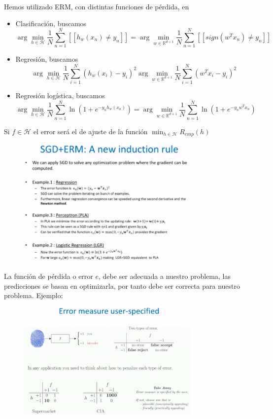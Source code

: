 \documentclass[11pt,a4paper]{article}
\theoremstyle{definition}
\newcommand{\R}{\mathbb{R}}
\begin{document}
	Hemos utilizado ERM, con distintas funciones de pérdida, en 
	\begin{itemize}
		\item Clasificación, buscamos $$\arg \min_{h\in \mathcal{H}} \frac{1}{N} \sum_{n=1}^N [[h_w(x_n)\neq y_n]] = \arg \min_{w\in \R^{d+1}} \frac{1}{N} \sum_{n=1}^N [[sign(w^Tx_n)\neq y_n]]$$
		
		\item Regresión, buscamos $$\arg \min_{h\in \mathcal{H}} \frac{1}{N}\sum_{i=1}^N(h_w(x_i)-y_i)^2 \arg \min_{w\in \R^{d+1}} \frac{1}{N}\sum_{i=1}^N(w^Tx_i-y_i)^2$$
		\item Regresión logística, buscamos 
		$$\arg \min_{h\in \mathcal{H}} \frac{1}{N} \sum_{n=1}^N \ln \left(1+e^{-y_n h_w(x_n)}\right) = 
		\arg \min_{w\in \R^{d+1}} \frac{1}{N} \sum_{n=1}^N \ln \left(1+e^{-y_nw^Tx_n}\right)$$
	\end{itemize}
	Si $f\in \mathcal{H}$ el error será el de ajuste de la función $\min_{h\in \mathcal{H}} R_{emp}(h)$ 
	\begin{figure}[H]
		\centering
		\includegraphics[width=0.8\textwidth]{images/sgd_erm}

	\end{figure}
	
	La función de pérdida o error $e$, debe ser adecuada a nuestro problema, las predicciones se basan en optimizarla, por tanto debe ser correcta para nuestro problema. Ejemplo:
	\begin{figure}[H]
		\centering
		\includegraphics[width=0.8\textwidth]{images/fingerprint_example}

	\end{figure}
	
\end{document}
